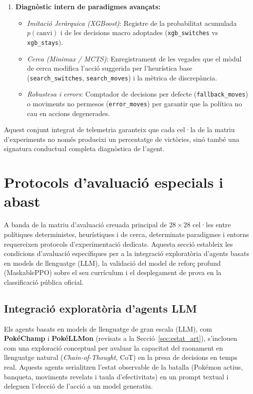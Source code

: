 \begin{enumerate}
    \item \textbf{Diagnòstic intern de paradigmes avançats:}
          \begin{itemize}
              \item \textit{Imitació Jeràrquica (XGBoost)}: Registre de la probabilitat acumulada $p(\text{canvi})$ i de les decisions macro adoptades (\texttt{xgb\_switches} vs \texttt{xgb\_stays}).
              \item \textit{Cerca (Minimax / MCTS)}: Enregistrament de les vegades que el mòdul de cerca modifica l'acció suggerida per l'heurística base (\texttt{search\_switches}, \texttt{search\_moves}) i la mètrica de discrepància.
              \item \textit{Robustesa i errors}: Comptador de decisions per defecte (\texttt{fallback\_moves}) o moviments no permesos (\texttt{error\_moves}) per garantir que la política no cau en accions degenerades.
          \end{itemize}
\end{enumerate}

Aquest conjunt integrat de telemetria garanteix que cada cel·la de la matriu d'experiments no només produeixi un percentatge de victòries, sinó també una signatura conductual completa diagnòstica de l'agent.

\section{Protocols d'avaluació especials i abast}
\label{sec:disseny_experiments}

A banda de la matriu d'avaluació creuada principal de $28 \times 28$ cel·les entre polítiques deterministes, heurístiques i de cerca, determinats paradigmes i entorns requereixen protocols d'experimentació dedicats. Aquesta secció estableix les condicions d'avaluació específiques per a la integració exploratòria d'agents basats en models de llenguatge (LLM), la validació del model de reforç profund (MaskablePPO) sobre el seu currículum i el desplegament de prova en la classificació pública oficial.

\subsection{Integració exploratòria d'agents LLM}

Els agents basats en models de llenguatge de gran escala (LLM), com \textbf{PokéChamp} i \textbf{PokéLLMon} (revisats a la Secció~\ref{sec:estat_art}), s'inclouen com una exploració conceptual per avaluar la capacitat del raonament en llenguatge natural (\textit{Chain-of-Thought}, CoT) en la presa de decisions en temps real. Aquests agents serialitzen l'estat observable de la batalla (Pokémon actius, banqueta, moviments revelats i taula d'efectivitats) en un prompt textual i deleguen l'elecció de l'acció a un model generatiu.

